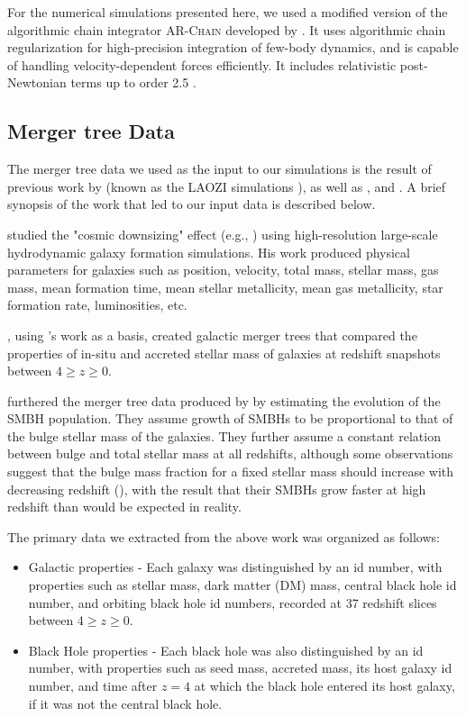 \documentclass[fleqn,usenatbib,useAMS]{mnras}
\begin{document}
For the numerical simulations presented here, we used a modified version of the algorithmic chain integrator \textsc{AR-Chain} developed by \citet{2006MNRAS.372..219M}. It uses algorithmic chain regularization for high-precision integration of few-body dynamics, and is capable of handling velocity-dependent forces efficiently. It includes relativistic post-Newtonian terms up to order 2.5 \citep{2008AJ....135.2398M}.


\subsection{Merger tree Data}
The merger tree data we used as the input to our simulations is the result of previous work by \citet{2011ApJ...741...99C, 2011ApJ...742L..33C, 2012ApJ...753...17C, 2012ApJ...748..121C, 2013ApJ...770..139C}  (known as the LAOZI simulations \citealt{2014ApJ...781...38C}), as well as  \citet{2012MNRAS.425..641L}, and \citet{2015ApJ...799..178K}.  A brief synopsis of the work that led to our input data is described below.

\citet{2011ApJ...741...99C} studied the "cosmic downsizing" effect (e.g., \citealt{1996AJ....112..839C}) using high-resolution large-scale hydrodynamic galaxy formation simulations.  His work produced physical parameters for galaxies such as position, velocity, total mass, stellar mass, gas mass, mean formation time, mean stellar metallicity, mean gas metallicity, star formation rate, luminosities, etc.

\citet{2012MNRAS.425..641L}, using \citet{2011ApJ...741...99C}'s work as a basis, created galactic merger trees that compared the properties of in-situ and accreted stellar mass of galaxies at redshift snapshots between $4\geq z \geq0$.

\citet{2015ApJ...799..178K} furthered the merger tree data produced by \citet{2012MNRAS.425..641L} by estimating the evolution of the SMBH population.  They assume growth of SMBHs to be proportional to that of the bulge stellar mass of the galaxies.  They further assume a constant relation between bulge and total stellar mass at all redshifts, although some observations suggest that the bulge mass fraction for a fixed stellar mass should increase with decreasing redshift (\citealt{2012MNRAS.423.1992S, 2013MNRAS.428.1351G, 2014MNRAS.441..417A}), with the result that their SMBHs grow faster at high redshift than would be expected in reality.

The primary data we extracted from the above work was organized as follows:
\begin{itemize}
    \item Galactic properties - Each galaxy was distinguished by an id number, with properties such as stellar mass, dark matter (DM) mass, central black hole id number, and orbiting black hole id numbers, recorded at 37 redshift slices between $4\geq z \geq0$.
    \item Black Hole properties - Each black hole was also distinguished by an id number, with properties such as seed mass, accreted mass, its host galaxy id number, and time after $z=4$ at which the black hole entered its host galaxy, if it was not the central black hole.
\end{itemize}
\end{document}
